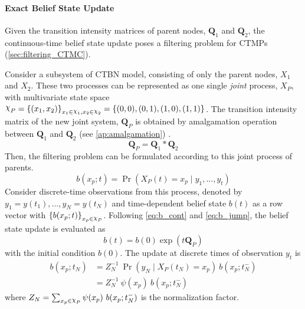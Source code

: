 \paragraph*{Exact Belief State Update}
\label{par:bs_exact}
Given the transition intensity matrices of parent nodes, $ \textbf{Q}_1 $ and $ \textbf{Q}_2 $, the continuous-time belief state update poses a filtering problem for CTMPs (\cref{sec:filtering_CTMC}). 

Consider a subsystem of CTBN model, consisting of only the parent nodes, $ X_1 $ and $ X_2 $. These two processes can be represented as one single \textit{joint} process, $ X_P $, with multivariate state space $ \rchi_{P} = \left\lbrace (x_1, x_2)\right\rbrace_{x_1\in \rchi_1, x_2 \in \rchi_2}  = \left\lbrace (0,0), (0,1), (1,0), (1,1)\right\rbrace  $. The transition intensity matrix of the new joint system, $ \textbf{Q}_P $ is obtained by amalgamation operation between $ \textbf{Q}_{1} $ and  $ \textbf{Q}_{2} $ (see \cref{ap:amalgamation}) \cite{Nodelman1995}.
\begin{equation}
\textbf{Q}_P = \textbf{Q}_{1} * \textbf{Q}_{2}
\end{equation}
Then, the filtering problem can be formulated according to this joint process of parents.
\begin{equation}
b(x_p; t) = \operatorname{Pr}( X_P(t) = x_{p} \mid y_{1}, ..., y_{t})
\end{equation}
Consider discrete-time observations from this process, denoted by $ y_{1}=y(t_{1}), ..., y_{N}=y(t_{N}) $ and time-dependent belief state $ b(t) $ as a row vector with $ \left\lbrace b(x_p;t)\right\rbrace_{x_p \in \rchi_P} $. Following \autoref{eq:b_cont} and \autoref{eq:b_jump}, the belief state update is evaluated as
\begin{equation}
b(t) = b(0) \exp(t\textbf{Q}_P)
\end{equation}
with the initial condition $ b(0) $.
The update at discrete times of observation $ y_{t} $ is
\begin{align}
b(x_p; t_{N}) &= Z_{N}^{-1}\ {\operatorname{Pr}(y_{N} \mid X_P(t_{N})=x_p)}\ {b(x_p; t_{N}^{-})} \\ & = Z_{N}^{-1}\ \psi(x_p) \ {b(x_p; t_{N}^{-})}
\end{align}
where $ Z_{N} = \sum_{x_p\in \rchi_P} \psi(x_p)\ b(x_p; t_{N}^{-}) $ is the normalization factor.

